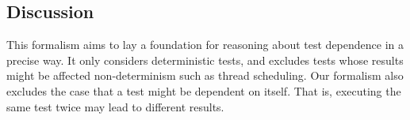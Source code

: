 \subsection{Discussion}
\label{sec:formaldiscussion}

This formalism aims to lay a foundation for reasoning about
test dependence in a precise way. It only considers
deterministic tests, and excludes tests whose results
might be affected non-determinism such as thread scheduling.
Our formalism also excludes the case that a test might
be dependent on itself. That is, executing the same
test twice may lead to different results.







